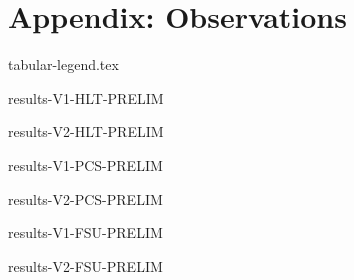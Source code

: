 \chapter{Appendix: Observations}

\newcommand{\ObservationTable}[2]{%
\begin{table}[h!]
  \centering
  \label{tab:V#1-#2}
  \caption{Observations for $\CGKAmod{\VersionOne}{T}{N} \models \LTLPredicate{#2}$}
  {results-V#1-#2-PRELIM}
\end{table}
}

\begin{table}[h!]
  \centering
  \label{tab:table-legend}
  \caption{Legend of symbols appearing in tables}
  {tabular-legend.tex}
\end{table}

\ObservationTable{1}{HLT}
\ObservationTable{2}{HLT}
\ObservationTable{1}{PCS}
\ObservationTable{2}{PCS}
\ObservationTable{1}{FSU}
\ObservationTable{2}{FSU}
